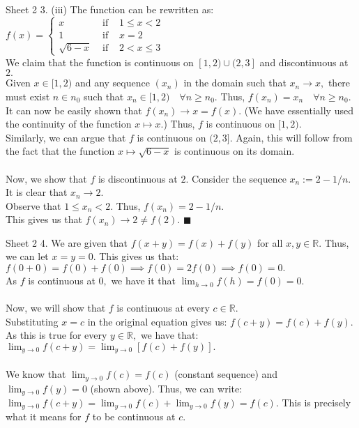 \documentclass[handout, aspectratio=169]{beamer}
\begin{document}
\begin{frame}{Sheet 2}
	3. (iii) The function can be rewritten as:
	$f(x)=\left\{\begin{array}{ccl}{x} & {\text { if }} & {1 \leq x<2} \\ {1} & {\text { if }} & {x=2} \\ {\sqrt{6-x}} & {\text { if }} & {2<x \leq 3}\end{array}\right.$\\
	We claim that the function is continuous on $[1, 2) \cup (2, 3]$ and discontinuous at $2.$\\
	Given $x \in [1, 2)$ and any sequence $(x_n)$ in the domain such that $x_n \to x,$ there must exist $n \in n_0$ such that $x_n \in [1, 2) \quad \forall n \ge n_0.$ Thus, $f(x_n) = x_n \quad \forall n \ge n_0.$ It can now be easily shown that $f(x_n) \to x = f(x).$ (We have essentially used the continuity of the function $x \mapsto x.$) Thus, $f$ is continuous on $[1, 2).$\\
	Similarly, we can argue that $f$ is continuous on $(2, 3].$ Again, this will follow from the fact that the function $x\mapsto \sqrt{6-x}$ is continuous on its domain.\\~\\
	Now, we show that $f$ is discontinuous at $2.$ Consider the sequence $x_n := 2 - 1/n.$ It is clear that $x_n \to 2.$\\
	Observe that $1 \le x_n < 2.$ Thus, $f(x_n) = 2-1/n.$\\
	This gives us that $f(x_n) \to 2 \neq f(2).$ \hfill $\blacksquare$ 
\end{frame}
\begin{frame}{Sheet 2}
	4. We are given that $f(x + y) = f(x) + f(y)$ for all $x, y \in \mathbb{R}.$ Thus, we can let $x = y = 0.$ This gives us that:\\
	$f(0 + 0) = f(0) + f(0) \implies f(0) = 2f(0) \implies f(0) = 0.$\\
	As $f$ is continuous at $0,$ we have it that $\displaystyle\lim_{h\to 0}f(h) = f(0) = 0.$\\~\\
	Now, we will show that $f$ is continuous at every $c \in \mathbb{R}.$\\
	Substituting $x = c$ in the original equation gives us:
	$f(c+y) = f(c) + f(y).$ As this is true for every $y \in \mathbb{R},$ we have that: $\displaystyle\lim_{y\to 0}f(c+y) = \lim_{y\to 0}[f(c) + f(y)].$\\~\\
	We know that $\displaystyle\lim_{y\to 0}f(c) = f(c)$ (constant sequence) and $\displaystyle\lim_{y\to 0}f(y) = 0$ (shown above). Thus, we can write: \\
	$\displaystyle\lim_{y\to 0}f(c+y) = \lim_{y\to 0}f(c) + \lim_{y\to 0} f(y) = f(c).$ This is precisely what it means for $f$ to be continuous at $c.$\\
\end{frame}
\end{document}
